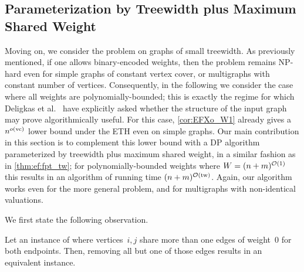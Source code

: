 


\subsection{Parameterization by Treewidth plus Maximum Shared Weight}\label{subsec:EFXo:tw}

Moving on, we consider the {\EFXo} problem on graphs of small treewidth.
As previously mentioned, if one allows binary-encoded weights, then the problem remains
NP-hard even for simple graphs of constant vertex cover, or multigraphs with constant number
of vertices. Consequently, in the following we consider the case where all weights are polynomially-bounded;
this is exactly the regime for which Deligkas et al.~\cite{ijcai/DeligkasEGK25} have explicitly asked whether
the structure of the input graph may prove algorithmically useful.
For this case, \cref{cor:EFXo_W1} already gives a $n^{o(\mathrm{vc})}$ lower bound under the ETH even on
simple graphs. Our main contribution in this section is to complement this lower bound with a DP algorithm parameterized by treewidth
plus maximum shared weight, in a similar fashion as in \cref{thm:ef:fpt_tw};
for polynomially-bounded weights where $W = (n+m)^{\mathcal{O}(1)}$ this results in an algorithm of running time $(n+m)^{\mathcal{O}(\mathrm{tw})}$.
Again, our algorithm works even for the more general {\EFXmc} problem, and for multigraphs with non-identical valuations.

We first state the following observation.

\begin{observation}\label{obs:efx_zero_value_goods}
    Let an instance of {\EFXo} where vertices~$i,j$ share more than one edges of weight~$0$ for both endpoints.
    Then, removing all but one of those edges results in an equivalent instance.
\end{observation}

